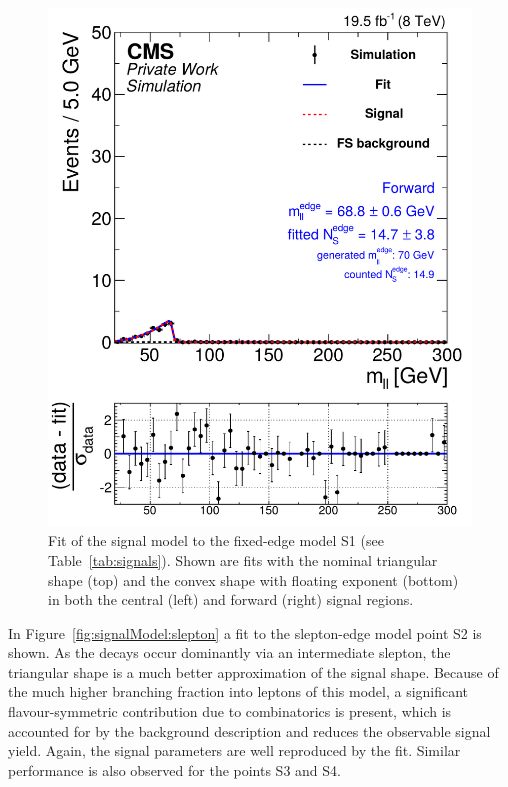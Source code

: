 \begin{figure}[hbp]
\begin{minipage}[t]{0.49\textwidth}
    \includegraphics[width=\textwidth]{plots/results/fit/mcFits/shapeIllustrationKX4_SignalInclusive_Combined_Full2012_KX4_MC_edge_400_150_80_Forward.pdf}
  \end{minipage}
  \caption{Fit of the signal model to the fixed-edge model S1 (see Table~\ref{tab:signals}). Shown are fits with the nominal triangular shape (top) and the convex shape with floating exponent (bottom) in both the central (left) and forward (right) signal regions.}
  \label{fig:signalModel:edge}
\end{figure}

In Figure~\ref{fig:signalModel:slepton} a fit to the slepton-edge model point S2 is shown. As the decays occur dominantly via an intermediate slepton, the triangular shape is a much better approximation of the signal shape. Because of the much higher branching fraction into leptons of this model, a significant flavour-symmetric contribution due to combinatorics is present, which is accounted for by the background description and reduces the observable signal yield. Again, the signal parameters are well reproduced by the fit. Similar performance is also observed for the points S3 and S4. 

